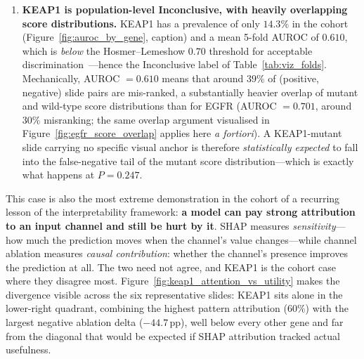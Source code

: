 \begin{enumerate}
    \item \textbf{KEAP1 is population-level Inconclusive, with
    heavily overlapping score distributions.}
    KEAP1 has a prevalence of only $14.3\%$ in the cohort
    (Figure~\ref{fig:auroc_by_gene}, caption) and a mean 5-fold
    AUROC of $0.610$, which is \emph{below} the
    Hosmer--Lemeshow $0.70$ threshold for acceptable
    discrimination~\cite{hosmer2000applied}---hence the
    Inconclusive label of Table~\ref{tab:viz_folds}.
    Mechanically, AUROC $= 0.610$ means that around $39\%$ of
    (positive, negative) slide pairs are mis-ranked, a
    substantially heavier overlap of mutant and wild-type score
    distributions than for EGFR (AUROC $= 0.701$, around $30\%$
    misranking; the same overlap argument visualised in
    Figure~\ref{fig:egfr_score_overlap} applies here \emph{a
    fortiori}).
    A KEAP1-mutant slide carrying no specific visual anchor is
    therefore \emph{statistically expected} to fall into the
    false-negative tail of the mutant score distribution---which
    is exactly what happens at $P = 0.247$.
\end{enumerate}

This case is also the most extreme demonstration in the cohort
of a recurring lesson of the interpretability framework:
\textbf{a model can pay strong attribution to an input channel
and still be hurt by it}.
SHAP measures \emph{sensitivity}---how much the prediction
moves when the channel's value changes---while channel ablation
measures \emph{causal contribution}: whether the channel's
presence improves the prediction at all.
The two need not agree, and KEAP1 is the cohort case where they
disagree most.
Figure~\ref{fig:keap1_attention_vs_utility} makes the divergence
visible across the six representative slides: KEAP1 sits alone
in the lower-right quadrant, combining the highest pattern
attribution ($60\%$) with the largest negative ablation delta
($-44.7$\,pp), well below every other gene and far from the
diagonal that would be expected if SHAP attribution tracked
actual usefulness.

